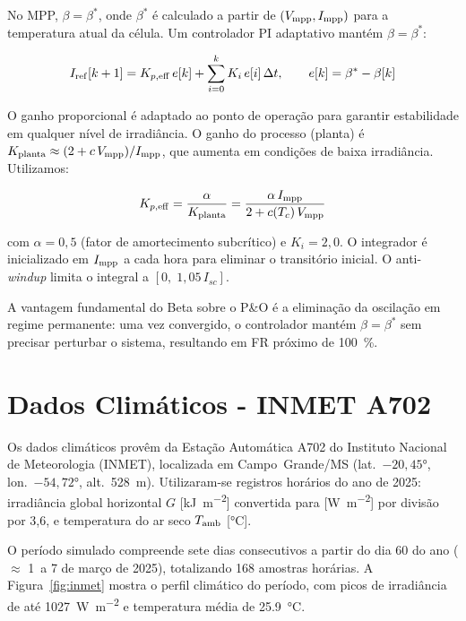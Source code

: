 \documentclass[11pt,a4paper]{article}
\begin{document}
No MPP, $\beta = \beta^*$, onde $\beta^*$ é calculado a partir de
$(V_{\rm mpp}, I_{\rm mpp})$ para a temperatura atual da célula. Um controlador
PI adaptativo mantém $\beta = \beta^*$:

\begin{equation}
  I_{\rm ref}[k+1] = K_{p,\rm eff}\,e[k] + \sum_{i=0}^{k} K_i\,e[i]\,\Delta t,
  \qquad e[k] = \beta^* - \beta[k]
  \label{eq:pi}
\end{equation}

O ganho proporcional é adaptado ao ponto de operação para garantir estabilidade em
qualquer nível de irradiância. O ganho do processo (planta) é
$K_{\rm planta} \approx (2 + c\,V_{\rm mpp})/I_{\rm mpp}$, que aumenta em
condições de baixa irradiância. Utilizamos:

\begin{equation}
  K_{p,\rm eff} = \frac{\alpha}{K_{\rm planta}}
  = \frac{\alpha\,I_{\rm mpp}}{2 + c(T_c)\,V_{\rm mpp}}
  \label{eq:kp_eff}
\end{equation}

\noindent com $\alpha = 0{,}5$ (fator de amortecimento subcrítico) e $K_i =
2{,}0$. O integrador é inicializado em $I_{\rm mpp}$ a cada hora para eliminar
o transitório inicial. O anti-\textit{windup} limita o integral a
$[0,\; 1{,}05\,I_{sc}]$.

A vantagem fundamental do Beta sobre o P\&O é a eliminação da oscilação em regime
permanente: uma vez convergido, o controlador mantém $\beta = \beta^*$ sem
precisar perturbar o sistema, resultando em FR próximo de \SI{100}{\percent}.

\section{Dados Climáticos - INMET A702}

Os dados climáticos provêm da Estação Automática A702 do Instituto Nacional de
Meteorologia (INMET), localizada em Campo~Grande/MS
(lat.~$-20{,}45°$, lon.~$-54{,}72°$, alt.~\SI{528}{\meter}). Utilizaram-se registros
horários do ano de 2025: irradiância global horizontal $G$ [\si{\kilo\joule\per\meter\squared}]
convertida para [\si{\watt\per\meter\squared}] por divisão por 3,6, e temperatura do
ar seco $T_{\rm amb}$ [\si{\celsius}].

O período simulado compreende sete dias consecutivos a partir do dia 60 do ano
($\approx$ 1\textordmasculine\ a 7 de março de 2025), totalizando 168 amostras horárias.
A Figura~\ref{fig:inmet} mostra o perfil climático do período, com picos de
irradiância de até \SI{1027}{\watt\per\meter\squared} e temperatura média de
\SI{25,9}{\celsius}.
\end{document}
